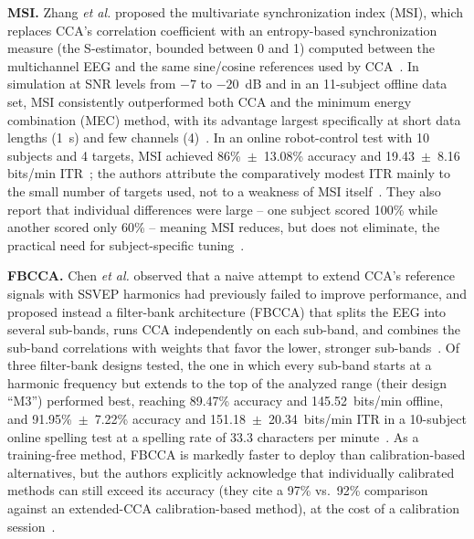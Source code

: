 \documentclass[11pt]{article}
\begin{document}
\textbf{MSI.} Zhang \textit{et al.} proposed the multivariate synchronization index (MSI), which replaces CCA's correlation coefficient with an entropy-based synchronization measure (the S-estimator, bounded between 0 and 1) computed between the multichannel EEG and the same sine/cosine references used by CCA~\cite{zhang2014msi}. In simulation at SNR levels from $-7$ to $-20$~dB and in an 11-subject offline data set, MSI consistently outperformed both CCA and the minimum energy combination (MEC) method, with its advantage largest specifically at short data lengths (1~s) and few channels (4)~\cite{zhang2014msi}. In an online robot-control test with 10 subjects and 4 targets, MSI achieved 86\%~$\pm$~13.08\% accuracy and 19.43~$\pm$~8.16 bits/min ITR~\cite{zhang2014msi}; the authors attribute the comparatively modest ITR mainly to the small number of targets used, not to a weakness of MSI itself~\cite{zhang2014msi}. They also report that individual differences were large -- one subject scored 100\% while another scored only 60\% -- meaning MSI reduces, but does not eliminate, the practical need for subject-specific tuning~\cite{zhang2014msi}.

\textbf{FBCCA.} Chen \textit{et al.} observed that a naive attempt to extend CCA's reference signals with SSVEP harmonics had previously failed to improve performance, and proposed instead a filter-bank architecture (FBCCA) that splits the EEG into several sub-bands, runs CCA independently on each sub-band, and combines the sub-band correlations with weights that favor the lower, stronger sub-bands~\cite{chen2015fbcca}. Of three filter-bank designs tested, the one in which every sub-band starts at a harmonic frequency but extends to the top of the analyzed range (their design ``M3'') performed best, reaching 89.47\% accuracy and 145.52~bits/min offline, and 91.95\%~$\pm$~7.22\% accuracy and 151.18~$\pm$~20.34~bits/min ITR in a 10-subject online spelling test at a spelling rate of 33.3 characters per minute~\cite{chen2015fbcca}. As a training-free method, FBCCA is markedly faster to deploy than calibration-based alternatives, but the authors explicitly acknowledge that individually calibrated methods can still exceed its accuracy (they cite a 97\% vs.\ 92\% comparison against an extended-CCA calibration-based method), at the cost of a calibration session~\cite{chen2015fbcca}.
\end{document}
